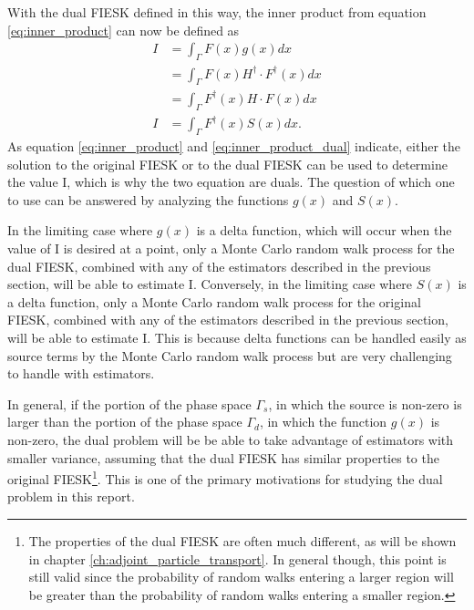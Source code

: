 With the dual FIESK defined in this way, the inner product from equation
\ref{eq:inner_product} can now be defined as
\begin{align}
  I & = \int_{\Gamma} F(x)g(x)dx \nonumber \\
  & = \int_{\Gamma} F(x) H^{\dagger} \cdot F^{\dagger}(x)dx \nonumber \\
  & = \int_{\Gamma}  F^{\dagger}(x) H \cdot F(x) dx \nonumber \\
  I & = \int_{\Gamma} F^{\dagger}(x)S(x) dx.
  \label{eq:inner_product_dual}
\end{align}
As equation \ref{eq:inner_product} and \ref{eq:inner_product_dual} indicate, 
either the solution to the original FIESK or to the dual FIESK can be used to 
determine the value I, which is why the two equation are duals. The question
of which one to use can be answered by analyzing the functions $g(x)$ and
$S(x)$. 

In the limiting case where $g(x)$ is a delta function, which will occur when
the value of I is desired at a point, only a Monte Carlo random walk process for
the dual FIESK, combined with any of the estimators described in the previous 
section, will be able to estimate I. Conversely, in the limiting case where 
$S(x)$ is a delta function, only a Monte Carlo random walk process for the 
original FIESK, combined with any of the estimators described in the previous 
section, will be able to estimate I. This is because delta functions can be 
handled easily as source terms by the Monte Carlo random walk process but are 
very challenging to handle with estimators. 

In general, if the portion of the phase space $\Gamma_s$, in which the source 
is non-zero is larger than the portion of the phase space $\Gamma_d$, in which 
the function $g(x)$ is non-zero, the dual problem will be be able to take 
advantage of estimators with smaller variance, assuming that the dual FIESK has 
similar properties to the original FIESK\footnote{The properties of the dual
FIESK are often much different, as will be shown in chapter 
\ref{ch:adjoint_particle_transport}. In general though, this point is still 
valid since the probability of random walks entering a larger region will be
greater than the probability of random walks entering a smaller region.}. This 
is one of the primary motivations for studying the dual problem in this report.

